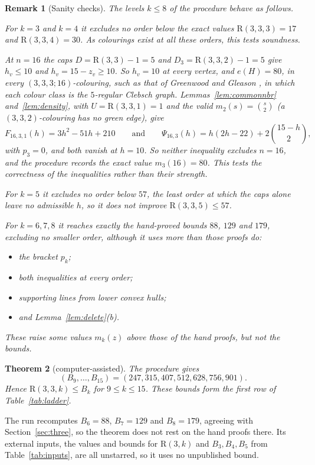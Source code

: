\documentclass[11pt]{article}
\theoremstyle{spacedplain}
\newtheorem{theorem}{Theorem}[section]
\theoremstyle{spaceddef}
\theoremstyle{spacedremark}
\newtheorem{remark}[theorem]{Remark}
\newcommand{\R}{\mathrm{R}}
\begin{document}
\begin{remark}[Sanity checks]\label{rem:sanity}
The levels $k\le 8$ of the procedure behave as follows.

For $k=3$ and $k=4$ it excludes no order below the exact values $\R(3,3,3)=17$ and $\R(3,3,4)=30$.
As colourings exist at all these orders, this tests soundness.

At $n=16$ the caps $D=\R(3,3)-1=5$ and $D_3=\R(3,3,2)-1=5$ give $h_v\le 10$ and $h_v=15-z_v\ge 10$.
So $h_v=10$ at every vertex, and $e(H)=80$, in every $(3,3,3;16)$-colouring, such as that of Greenwood and Gleason \cite{GG55}, in which each colour class is the $5$-regular Clebsch graph.
Lemmas~\ref{lem:commonnbr} and~\ref{lem:density}, with $U=\R(3,3,1)=1$ and the valid $m_2(s)=\binom s2$ (a $(3,3,2)$-colouring has no green edge), give
\[
F_{16,3,1}(h)=3h^2-51h+210\qquad\text{and}\qquad\Psi_{16,3}(h)=h(2h-22)+2\binom{15-h}{2},
\]
with $p_3=0$, and both vanish at $h=10$.
So neither inequality excludes $n=16$, and the procedure records the exact value $m_3(16)=80$.
This tests the correctness of the inequalities rather than their strength.

For $k=5$ it excludes no order below $57$, the least order at which the caps alone leave no admissible $h$, so it does not improve $\R(3,3,5)\le 57$.

For $k=6,7,8$ it reaches exactly the hand-proved bounds $88$, $129$ and $179$, excluding no smaller order, although it uses more than those proofs do:
\begin{itemize}
\item the bracket $p_k$;
\item both inequalities at every order;
\item supporting lines from lower convex hulls;
\item and Lemma~\ref{lem:delete}(b).
\end{itemize}
These raise some values $m_k(z)$ above those of the hand proofs, but not the bounds.
\end{remark}

\begin{theorem}[computer-assisted]\label{thm:ladder}
The procedure gives
\[
(B_9,\dots,B_{15})=(247,315,407,512,628,756,901).
\]
Hence $\R(3,3,k)\le B_k$ for $9\le k\le 15$.
These bounds form the first row of Table~\ref{tab:ladder}.
\end{theorem}

The run recomputes $B_6=88$, $B_7=129$ and $B_8=179$, agreeing with Section~\ref{sec:three}, so the theorem does not rest on the hand proofs there.
Its external inputs, the values and bounds for $\R(3,k)$ and $B_3,B_4,B_5$ from Table~\ref{tab:inputs}, are all unstarred, so it uses no unpublished bound.
\end{document}
